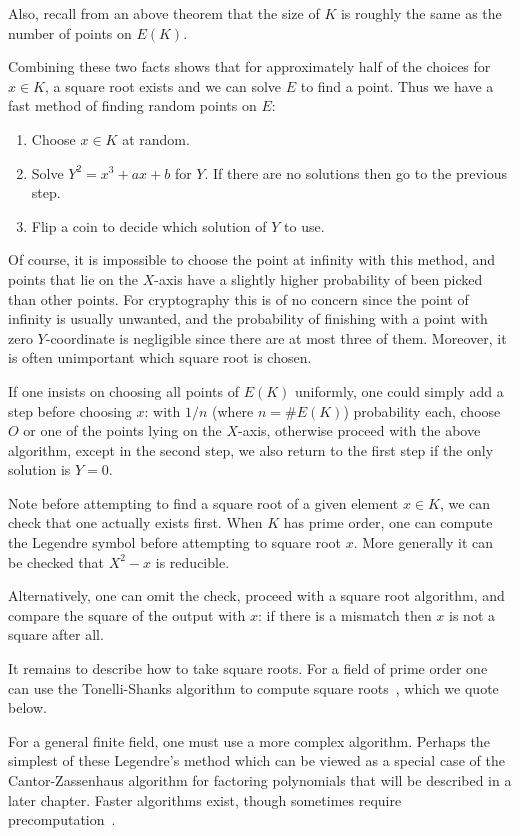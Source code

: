 Also, recall from an above theorem that the size of $K$ is roughly the same
as the number of points on $E(K)$.

Combining these two facts shows that
for approximately half of the choices for $x \in K$,
a square root exists and we can solve $E$ to
find a point. Thus we have a fast method of finding random points on
$E$:

\begin{enumerate}
\item
Choose $x \in K$ at random.
\item
Solve $Y^2 = x^3 + a x + b$ for $Y$. If there are no solutions
then go to the previous step.
\item
Flip a coin to decide which solution of $Y$ to use.
\end{enumerate}

Of course, it is impossible to choose the point at infinity with this method,
and points that lie on the $X$-axis have a slightly higher probability of
been picked than other points. For cryptography this is of no concern
since the point of infinity is usually unwanted, and the probability
of finishing with a point with zero $Y$-coordinate is negligible since there
are at most three of them. Moreover, it is often unimportant which
square root is chosen.

If one insists on choosing all points of $E(K)$ uniformly, one could simply
add a step before choosing $x$: with $1/n$ (where
$n = \#E(K)$) probability each,
choose $O$ or one of the points lying
on the $X$-axis, otherwise proceed with the above algorithm, except
in the second step, we also return to the first step if the only solution
is $Y = 0$.

Note before attempting to find a square root of a given element $x \in K$,
we can check that one actually exists first.
When $K$ has prime order,
one can compute the Legendre symbol before attempting to square root $x$.
More generally it can be checked that $X^2 - x$ is reducible.

Alternatively,
one can omit the check, proceed with a square root algorithm,
and compare the square of the output with $x$: if there is a mismatch
then $x$ is not a square after all.

It remains to describe how to take square roots.
For a field of prime order one can use the Tonelli-Shanks algorithm
to compute square roots~\cite{bss, handbook}, which we quote below.

For a general finite field,
one must use a more complex algorithm. Perhaps the simplest of these
Legendre's method which can be viewed as a special
case of the Cantor-Zassenhaus algorithm for factoring polynomials that
will be described in a later chapter.
Faster algorithms exist, though sometimes require precomputation~\cite{djb}.

